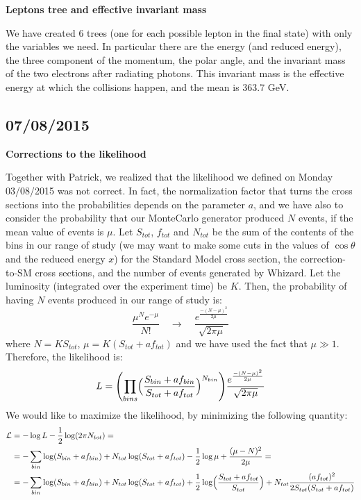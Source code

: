 \textbf{Leptons tree and effective invariant mass}

We have created 6 trees (one for each possible lepton in the final state) with only the variables we need. In particular there are the energy (and reduced energy), the three component of the momentum, the polar angle, and the invariant mass of the two electrons after radiating photons. This invariant mass is the effective energy at which the collisions happen, and the mean is 363.7 GeV. 

\subsection{07/08/2015}

\textbf{Corrections to the likelihood}

Together with Patrick, we realized that the likelihood we defined on Monday 03/08/2015 was not correct. In fact, the normalization factor that turns the cross sections into the probabilities depends on the parameter $a$, and we have also to consider the probability that our MonteCarlo generator produced $N$ events, if the mean value of events is $\mu$.
Let $S_{tot}$, $f_{tot}$ and $N_{tot}$ be the sum of the contents of the bins in our range of study (we may want to make some cuts in the values of $\cos\theta$ and the reduced energy $x$) for the Standard Model cross section, the correction-to-SM cross sections, and the number of events generated by Whizard. Let the luminosity (integrated over the experiment time) be $K$. Then, the probability of having $N$ events produced in our range of study is:
\[
\frac{\mu^Ne^{-\mu}}{N!} \quad\rightarrow\quad \frac{e^{\frac{-(N-\mu)^2}{2\mu}}}{\sqrt{2\pi\mu}}
\]
where $N=KS_{tot}$, $\mu = K(S_{tot}+af_{tot})$ and we have used the fact that $\mu \gg 1$.
Therefore, the likelihood is:
\[
L = \Biggl(\prod_{bins}\Bigl(\frac{S_{bin}+af_{bin}}{S_{tot}+af_{tot}}\Bigr)^{N_{bin}}\Biggr)\frac{e^{\frac{-(N-\mu)^2}{2\mu}}}{\sqrt{2\pi\mu}}
\]
We would like to maximize the likelihood, by minimizing the following quantity:
\begin{equation}
\begin{split}
\mathcal{L} &= -\log L -\frac{1}{2}\log(2\pi N_{tot}) =\\
&=- \sum_{bin}\log(S_{bin}+af_{bin})+N_{tot}\log(S_{tot}+af_{tot})-\frac{1}{2}\log\mu+\frac{(\mu-N)^2}{2\mu} =\\
&=- \sum_{bin}\log(S_{bin}+af_{bin})+N_{tot}\log(S_{tot}+af_{tot})+\frac{1}{2}\log\Bigl(\frac{S_{tot}+af_{tot}}{S_{tot}}\Bigr)+N_{tot}\frac{(af_{tot})^2}{2S_{tot}(S_{tot}+af_{tot})}
\end{split}
\end{equation}